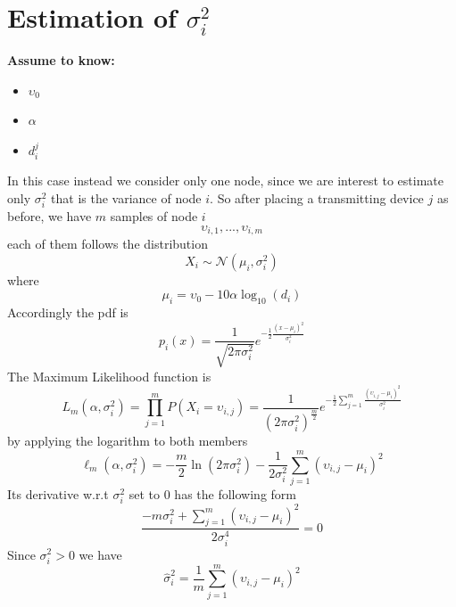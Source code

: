 \documentclass[12pt,twoside]{report}
\begin{document}
\section{Estimation of $\sigma^2_i$}
  \begin{center}
  \textbf{Assume to know:}
  \begin{itemize}
    \centering
    \item $\upsilon_0$
    \item $\alpha$
    \item $d_i^j$
  \end{itemize}
  \end{center}
In this case instead we consider only one node, since we are interest to estimate only $\sigma^2_i$ that is the variance of node $i$.
So after placing a transmitting device $j$ as before, we have $m$ samples of node $i$ $$\upsilon_{i,1},...,\upsilon_{i,m}$$ each of them follows the distribution
\begin{equation}
    X_i\sim \mathcal{N}(\mu_i,\sigma^2_i)
    \label{eq:3}
\end{equation}
where 
\begin{equation}
    \mu_i = \upsilon_0-10\alpha\log_{10}(d_i)
\end{equation}
Accordingly the pdf is
\begin{equation}
    p_{i}(x)=\frac{1}{\sqrt{2\pi\sigma_i^2}}e^{-\frac{1}{2}\frac{(x-\mu_i)^2}{\sigma^2_i}}
    \label{eq:20}
\end{equation}
The Maximum Likelihood function is
\begin{equation}
    L_m(\alpha,\sigma_i^2)=\prod_{j=1}^mP(X_i=\upsilon_{i,j})=
    \frac{1}{(2\pi\sigma_i^2)^{\frac{m}{2}}}e^{-\frac{1}{2}\sum_{j=1}^m\frac{(\upsilon_{i,j}-\mu_i)^2}{\sigma^2_i}}
\end{equation}
by applying the logarithm to both members
\begin{equation}
    \ell_m(\alpha,\sigma^2_i)=-\frac{m}{2}\ln(2\pi\sigma^2_i)-\frac{1}{2\sigma^2_i}\sum_{j=1}^m(\upsilon_{i,j}-\mu_i)^2
    \label{eq:4}
\end{equation}
Its derivative w.r.t $\sigma^2_i$ set to $0$ has the following form 
\begin{equation}
    \frac{-m\sigma^2_i+\sum_{j=1}^m(\upsilon_{i,j}-\mu_i)^2}{2\sigma^4_i}=0
\end{equation}
Since $\sigma^2_i>0$ we have
\begin{equation}
    \hat{\sigma}^2_i=\frac{1}{m}\sum_{j=1}^m(\upsilon_{i,j}-\mu_i)^2
\end{equation}
\end{document}
